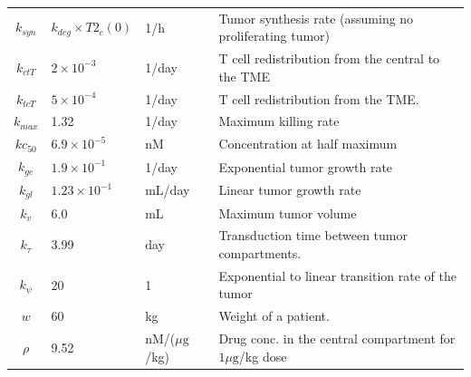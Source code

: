 \begin{landscape}
\begin{table}[!ht]
\begin{tabular}{c l  l  l}
			$k_{syn}$ & $k_{deg} \times T2_c(0)$ & 1/h & Tumor synthesis rate (assuming no proliferating tumor) \\
			$k_{ctT}$ & $2 \times 10^{-3}$ & 1/day & T cell redistribution from the central to the \ac{TME} \\
			$k_{tcT}$ & $5\times 10^{-4}$& 1/day & T cell redistribution from the \ac{TME}.  \\
			$k_{max}$ & 1.32& 1/day & Maximum killing rate  \\
			$kc_{50}$ & $6.9\times 10^{-5}$& nM & Concentration at half maximum  \\
			$k_{ge}$ & $1.9\times 10^{-1}$& 1/day & Exponential tumor growth rate  \\
			$k_{gl}$ & $1.23 \times 10^{-1}$& mL/day & Linear tumor growth rate  \\
			$k_{v}$ & $6.0$& mL & Maximum tumor volume  \\
			$k_{\tau}$ & 3.99& day& Transduction time between tumor compartments.  \\
			$k_{\psi}$ & 20 & 1 & Exponential to linear transition rate of the tumor  \\
			$w$ & 60 & kg & Weight of a patient.  \\
			$\rho$ & 9.52 & nM/($\mu\text{g}$/kg) & Drug conc. in the central compartment for $1\mu\text{g}$/kg dose  \\[1ex] 
			\hline
		\end{tabular}
		\label{table:def1}
	\end{table}
	

\end{landscape}
